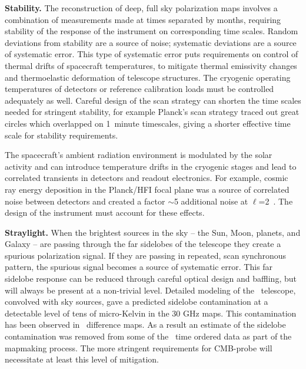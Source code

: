 \textbf{Stability.}  %
The reconstruction of deep, full sky polarization maps involves a combination of measurements made at times
separated by months, requiring stability of the response of the instrument on corresponding time scales.  Random deviations
from stability are a source of noise; systematic deviations are a source of systematic error. 
This type of systematic error puts requirements on control of thermal drifts of spacecraft temperatures, to
mitigate thermal emissivity changes and thermoelastic deformation of telescope structures.  
The cryogenic operating temperatures of detectors or reference calibration loads must be controlled
adequately as well. Careful design of the scan strategy can shorten the time
scales needed for stringent stability, for example Planck's scan strategy traced out great circles which overlapped on
1~minute timescales, giving a shorter effective time scale for stability requirements. 

The spacecraft's ambient radiation environment is modulated by the solar activity and
can introduce temperature drifts in the cryogenic stages and lead to correlated transients in detectors and readout electronics.  
For example, cosmic ray energy deposition in the Planck/HFI focal plane was a source of 
correlated noise between detectors and created a factor $\sim$5 
additional noise at $\ell$=2~\cite{planck2016_xlvi}.
The design of the instrument must account for these effects.

\textbf{Straylight.}   When the brightest sources in the sky -- the Sun, Moon, planets, and Galaxy --
are passing through the far sidelobes of the telescope they create a spurious polarization signal. If they are 
passing in repeated, scan synchronous pattern, the spurious signal becomes a source of systematic error. 
This far sidelobe response can be reduced through careful optical design and baffling, but will always be present 
at a non-trivial level.  Detailed modeling of the \planck\ telescope, convolved with sky sources, gave 
a predicted sidelobe contamination at a detectable level of tens of micro-Kelvin in the 30 GHz maps.  This
contamination has been observed in \planck\ difference maps.  
As a result an estimate of the sidelobe contamination was removed from some of the \planck\ time ordered data 
as part of the mapmaking process. The more stringent requirements for CMB-probe will necessitate at least 
this level of mitigation.  


